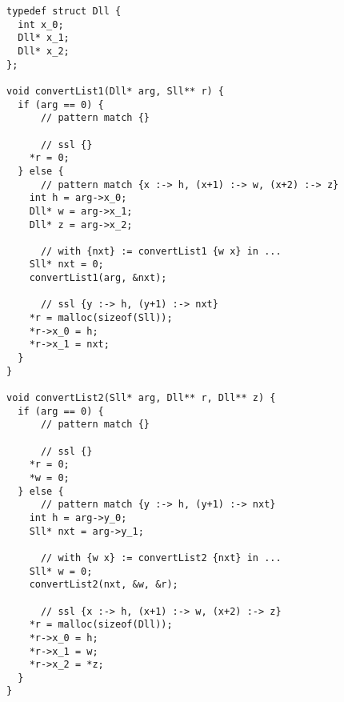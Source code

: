 \begin{lstlisting}
typedef struct Dll {
  int x_0;
  Dll* x_1;
  Dll* x_2;
};

void convertList1(Dll* arg, Sll** r) {
  if (arg == 0) {
      // pattern match {}

      // ssl {}
    *r = 0;
  } else {
      // pattern match {x :-> h, (x+1) :-> w, (x+2) :-> z}
    int h = arg->x_0;
    Dll* w = arg->x_1;
    Dll* z = arg->x_2;

      // with {nxt} := convertList1 {w x} in ...
    Sll* nxt = 0;
    convertList1(arg, &nxt);

      // ssl {y :-> h, (y+1) :-> nxt}
    *r = malloc(sizeof(Sll));
    *r->x_0 = h;
    *r->x_1 = nxt;
  }
}

void convertList2(Sll* arg, Dll** r, Dll** z) {
  if (arg == 0) {
      // pattern match {}

      // ssl {}
    *r = 0;
    *w = 0;
  } else {
      // pattern match {y :-> h, (y+1) :-> nxt}
    int h = arg->y_0;
    Sll* nxt = arg->y_1;

      // with {w x} := convertList2 {nxt} in ...
    Sll* w = 0;
    convertList2(nxt, &w, &r);

      // ssl {x :-> h, (x+1) :-> w, (x+2) :-> z}
    *r = malloc(sizeof(Dll));
    *r->x_0 = h;
    *r->x_1 = w;
    *r->x_2 = *z;
  }
}
\end{lstlisting}

%
%
%

